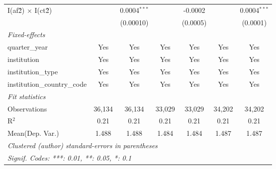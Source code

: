 \begin{tabular}{lcccccc}
   I(af\^2) $\times$ I(ct\^2)         &               & 0.0004$^{***}$ &               & -0.0002       &               & 0.0004$^{***}$\\   
                                      &               & (0.00010)      &               & (0.0005)      &               & (0.0001)\\   
   \midrule
   \emph{Fixed-effects}\\
   quarter\_year                      & Yes           & Yes            & Yes           & Yes           & Yes           & Yes\\  
   institution                        & Yes           & Yes            & Yes           & Yes           & Yes           & Yes\\  
   institution\_type                  & Yes           & Yes            & Yes           & Yes           & Yes           & Yes\\  
   institution\_country\_code         & Yes           & Yes            & Yes           & Yes           & Yes           & Yes\\  
   \midrule
   \emph{Fit statistics}\\
   Observations                       & 36,134        & 36,134         & 33,029        & 33,029        & 34,202        & 34,202\\  
   R$^2$                              & 0.21          & 0.21           & 0.21          & 0.21          & 0.21          & 0.21\\  
Mean(Dep. Var.) & 1.488 & 1.488 & 1.484 & 1.484 & 1.487 & 1.487 \\
   \midrule \midrule
   \multicolumn{7}{l}{\emph{Clustered (author) standard-errors in parentheses}}\\
   \multicolumn{7}{l}{\emph{Signif. Codes: ***: 0.01, **: 0.05, *: 0.1}}\\
\end{tabular}
\par\endgroup
